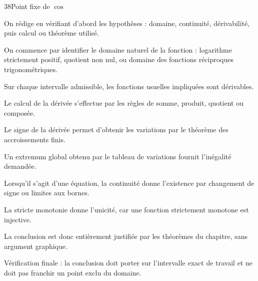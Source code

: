 \documentclass[11pt,a4paper]{article}
\begin{document}
\begin{corrbox}{38}{Point fixe de $\cos$}

\begin{methodebox}
On rédige en vérifiant d'abord les hypothèses : domaine, continuité, dérivabilité, puis calcul ou théorème utilisé.
\end{methodebox}

On commence par identifier le domaine naturel de la fonction : logarithme strictement positif, quotient non nul, ou domaine des fonctions réciproques trigonométriques.


Sur chaque intervalle admissible, les fonctions usuelles impliquées sont dérivables.


Le calcul de la dérivée s'effectue par les règles de somme, produit, quotient ou composée.


Le signe de la dérivée permet d'obtenir les variations par le théorème des accroissements finis.


Un extremum global obtenu par le tableau de variations fournit l'inégalité demandée.


Lorsqu'il s'agit d'une équation, la continuité donne l'existence par changement de signe ou limites aux bornes.


La stricte monotonie donne l'unicité, car une fonction strictement monotone est injective.


La conclusion est donc entièrement justifiée par les théorèmes du chapitre, sans argument graphique.


\begin{attentionbox}
Vérification finale : la conclusion doit porter sur l'intervalle exact de travail et ne doit pas franchir un point exclu du domaine.
\end{attentionbox}

\end{corrbox}
\end{document}
